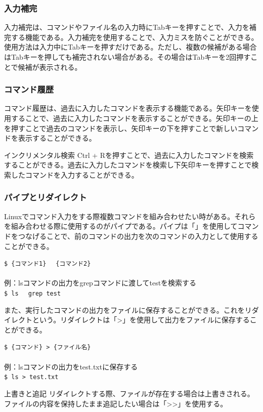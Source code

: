 \documentclass[a4paper, 11pt, dvipdfmx]{jsarticle}
\begin{document}
\subsubsection{入力補完}
入力補完は、コマンドやファイル名の入力時にTabキーを押すことで、入力を補完する機能である。入力補完を使用することで、入力ミスを防ぐことができる。使用方法は入力中にTabキーを押すだけである。ただし、複数の候補がある場合はTabキーを押しても補完されない場合がある。その場合はTabキーを2回押すことで候補が表示される。
\subsubsection{コマンド履歴}
コマンド履歴は、過去に入力したコマンドを表示する機能である。矢印キーを使用することで、過去に入力したコマンドを表示することができる。矢印キーの上を押すことで過去のコマンドを表示し、矢印キーの下を押すことで新しいコマンドを表示することができる。
\begin{hosokubox}{インクリメンタル検索}
  Ctrl + Rを押すことで、過去に入力したコマンドを検索することができる。過去に入力したコマンドを検索し下矢印キーを押すことで検索したコマンドを入力することができる。
\end{hosokubox}

\subsubsection{パイプとリダイレクト}
Linuxでコマンド入力をする際複数コマンドを組み合わせたい時がある。それらを組み合わせる際に使用するのがパイプである。パイプは「\textbar」を使用してコマンドをつなげることで、前のコマンドの出力を次のコマンドの入力として使用することができる。\\
  \begin{terminalbox}
    \verb|$ {コマンド1} | \textbar{} \verb| {コマンド2}|\\\\
    例：lsコマンドの出力をgrepコマンドに渡してtestを検索する\\
    \verb|$ ls | \textbar{} \verb| grep test|
  \end{terminalbox}
また、実行したコマンドの出力をファイルに保存することができる。これをリダイレクトという。リダイレクトは「\textgreater」を使用して出力をファイルに保存することができる。\\
\begin{terminalbox}
  \verb|$ {コマンド} > {ファイル名}|\\\\
  例：lsコマンドの出力をtest.txtに保存する\\
  \verb|$ ls > test.txt|
\end{terminalbox}
\begin{hosokubox}{上書きと追記}
  リダイレクトする際、ファイルが存在する場合は上書きされる。ファイルの内容を保持したまま追記したい場合は「\textgreater\textgreater」を使用する。
\end{hosokubox}
\end{document}
